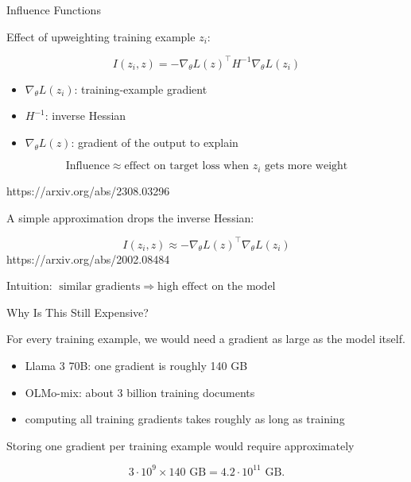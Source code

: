 \documentclass[11pt,compress,t,notes=noshow, xcolor=table]{beamer}
\begin{document}
\begin{vbframe}{Influence Functions}

Effect of upweighting training example \(z_i\):

\[
I(z_i,z)
=
-
\nabla_\theta L(z)^\top
H^{-1}
\nabla_\theta L(z_i)
\]

\begin{itemize}
  \item \(\nabla_\theta L(z_i)\): training-example gradient
  \item \(H^{-1}\): inverse Hessian
  \item \(\nabla_\theta L(z)\): gradient of the output to explain
\end{itemize}

\[
\text{Influence}
\approx
\text{effect on target loss when } z_i \text{ gets more weight}
\]

{https://arxiv.org/abs/2308.03296}

A simple approximation drops the inverse Hessian:

\[
I(z_i,z)
\approx
-
\nabla_\theta L(z)^\top
\nabla_\theta L(z_i)
\]
{https://arxiv.org/abs/2002.08484}

Intuition: $\text{similar gradients}
\;\Longrightarrow\;
\text{high effect on the model}$

\end{vbframe}



\begin{vbframe}{Why Is This Still Expensive?}

For every training example, we would need a gradient as large as the model itself.

\begin{itemize}
  \item Llama 3 70B: one gradient is roughly 140 GB
  \item OLMo-mix: about 3 billion training documents
  \item computing all training gradients takes roughly as long as training
\end{itemize}

Storing one gradient per training example would require approximately

\[
3 \cdot 10^9 \times 140\text{ GB}
=
4.2 \cdot 10^{11}\text{ GB}.
\]

\end{vbframe}
\end{document}
